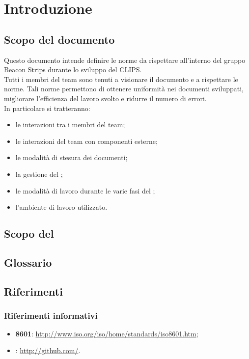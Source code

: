 \section{Introduzione}
\label{sec:1}
	\subsection{Scopo del documento}
	\label{sec:1.1}
		Questo documento intende definire le norme da rispettare all'interno del gruppo Beacon Strips durante lo sviluppo del  CLIPS. \\
		Tutti i membri del team sono tenuti a visionare il documento e a rispettare le norme. Tali norme permettono di ottenere uniformità nei documenti sviluppati,
		migliorare l'efficienza del lavoro svolto e ridurre il numero di errori. \\
		In particolare si tratteranno:
		\begin{itemize}
			\item le interazioni tra i membri del team;
			\item le interazioni del team con componenti esterne;
			\item le modalità di stesura dei documenti;
			\item la gestione del ;
			\item le modalità di lavoro durante le varie fasi del ;
			\item l'ambiente di lavoro utilizzato.
		\end{itemize}
	
	\subsection{Scopo del }
	\label{sec:1.2}
		\SCOPO
	\subsection{Glossario}
	\label{sec:1.3}
		\GLOSSARIO
	\subsection{Riferimenti}
	\label{sec:1.4}
		\subsubsection{Riferimenti informativi}
		\label{sec:1.4.1}
			\begin{itemize}
				\item \textbf{ 8601}: \url{http://www.iso.org/iso/home/standards/iso8601.htm};
				\item \textbf{}: \url{http://github.com/}.
			\end{itemize}
	
